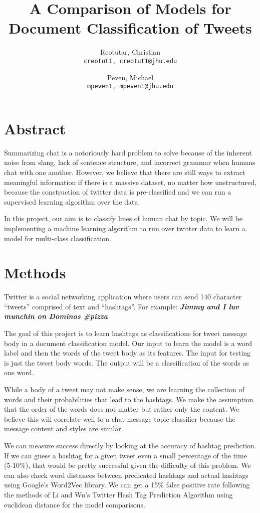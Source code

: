 \documentclass[11pt]{article}
\title{A Comparison of Models for Document Classification of Tweets}
\author{
  Reotutar, Christian\\
  \texttt{creotut1, creotut1@jhu.edu}
  \and
  Peven, Michael\\
  \texttt{mpeven1, mpeven1@jhu.edu}
}
\date{}
\begin{document}
\maketitle

\section{Abstract}
Summarizing chat is a notoriously hard problem to solve because of the inherent noise from slang, lack of sentence structure, and incorrect grammar when humans chat with one another. However, we believe that there are still ways to extract meaningful information if there is a massive dataset, no matter how unstructured, because the construction of twitter data is pre-classified and we can run a supervised learning algorithm over the data.

In this project, our aim is to classify lines of human chat by topic. We will be implementing a machine learning algorithm to run over twitter data to learn a model for multi-class classification.

\section{Methods}
Twitter is a social networking application where users can send 140 character “tweets” comprised of text and “hashtags”. For example: \textbf{\textit{Jimmy and I luv munchin on Dominos \#pizza}}

The goal of this project is to learn hashtags as classifications for tweet message body in a document classification model. Our input to learn the model is a word label and then the words of the tweet body as its features. The input for testing is just the tweet body words. The output will be a classification of the words as one word.

While a body of a tweet may not make sense, we are learning the collection of words and their probabilities that lead to the hashtags. We make the assumption that the order of the words does not matter but rather only the content.  We believe this will correlate well to a chat message topic classifier because the message content and styles are similar.

We can measure success directly by looking at the accuracy of hashtag prediction. If we can guess a hashtag for a given tweet even a small percentage of the time (5-10\%), that would be pretty successful given the difficulty of this problem. We can also check word distances between predicated hashtags and actual hashtags using Google's Word2Vec library.  We can get a 15\% false positive rate following the methods of Li and Wu's Twitter Hash Tag Prediction Algorithm using euclidean distance for the model comparisons.
\end{document}
